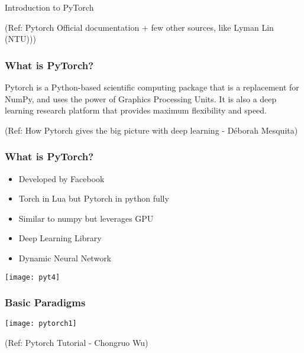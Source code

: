 \begin{frame}
  \begin{center}
    {\Large Introduction to PyTorch}
    
\tiny{(Ref: Pytorch Official documentation + few other sources, like Lyman Lin (NTU)))}
  \end{center}
\end{frame}

\begin{frame}[fragile] \frametitle{What is PyTorch?}
  \begin{center}

{\Large Pytorch is a Python-based scientific computing package that is a replacement for NumPy, and uses the power of Graphics Processing Units. It is also a deep learning research platform that provides maximum flexibility and speed.}

  \end{center}

  {\tiny (Ref: How Pytorch gives the big picture with deep learning - Déborah Mesquita)}
\end{frame}

\begin{frame}[fragile] \frametitle{What is PyTorch?}
\begin{itemize}
\item Developed by Facebook
\item Torch in Lua but Pytorch in python fully
\item Similar to numpy but leverages GPU
\item Deep Learning Library
\item Dynamic Neural Network
\end{itemize}
\begin{center}
\texttt{[image: pyt4]}
\end{center}
\end{frame}

\begin{frame}[fragile] \frametitle{Basic Paradigms}


\begin{center}
\texttt{[image: pytorch1]}
\end{center}

  {\tiny (Ref: Pytorch Tutorial - Chongruo Wu)}

\end{frame}

